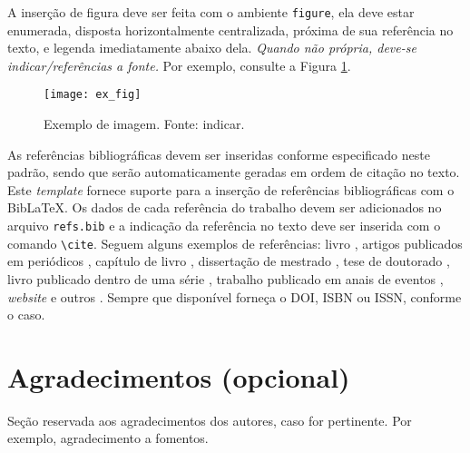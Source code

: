 \documentclass{pssbmac}
\begin{document}
A inserção de figura deve ser feita com o ambiente \verb!figure!, ela deve estar enumerada, disposta horizontalmente centralizada, próxima de sua referência no texto, e legenda imediatamente abaixo dela. \emph{Quando não própria, deve-se indicar/referências a fonte.} Por exemplo, consulte a Figura \ref{figura01}.

\begin{figure}[H]
\centering
\texttt{[image: ex\_fig]}
\caption{ {\small Exemplo de imagem. Fonte: indicar.}}
\label{figura01}
\end{figure}

As referências bibliográficas devem ser inseridas conforme especificado neste padrão, sendo que serão automaticamente geradas em ordem de citação no texto. Este {\it template} fornece suporte para a inserção de referências bibliográficas com o Bib\LaTeX{}. Os dados de cada referência do trabalho devem ser adicionados no arquivo \verb+refs.bib+ e a indicação da referência no texto deve ser inserida com o comando \verb+\cite+. Seguem alguns exemplos de referências: livro \cite{Boldrini}, artigos publicados em periódicos \cite{Contiero,Cuminato}, capítulo de livro \cite{daSilva}, dissertação de mestrado \cite{Diniz}, tese de doutorado \cite{Mallet}, livro publicado dentro de uma série \cite{Gomes}, trabalho publicado em anais de eventos \cite{Santos}, {\it website} e outros \cite{CNMAC}. Sempre que disponível forneça o DOI, ISBN ou ISSN, conforme o caso.

\section*{Agradecimentos (opcional)}

Seção reservada aos agradecimentos dos autores, caso for pertinente. Por exemplo, agradecimento a fomentos.


\printbibliography
\end{document}
